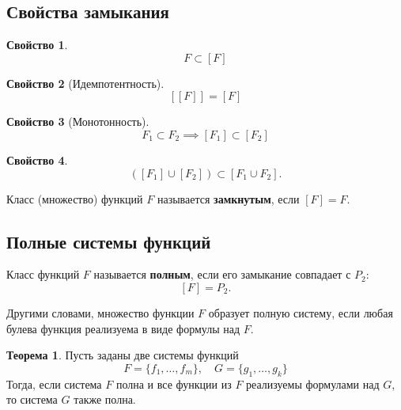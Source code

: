 \documentclass[a5paper, 11pt]{extarticle}
\theoremstyle{definition}
\newtheorem*{theorem*}{Теорема}
\newtheorem{property}{Свойство}[subsection]
\theoremstyle{definition}
\theoremstyle{definition}
\numberwithin{figure}{section}
\numberwithin{table}{section}
\begin{document}
\subsection{Свойства замыкания}

\begin{property}
    \[
        F \subset [F]
    \]
\end{property}

\begin{property}[Идемпотентность]
    \[
        [[F]] = [F]
    \]
\end{property}

\begin{property}[Монотонность]
    \[
        F_1 \subset F_2 \implies [F_1] \subset [F_2]
    \]
\end{property}

\begin{property}
    \[
        ([F_1] \cup [F_2]) \subset [F_1 \cup F_2].
    \]
\end{property}

Класс (множество) функций \(F\) называется \textbf{замкнутым}, если \([F] = F\).

\subsection{Полные системы функций}

Класс функций \(F\) называется \textbf{полным}, если его замыкание совпадает с \(P_2\):
\[
    [F] = P_2.
\]

Другими словами, множество функции \(F\) образует полную систему, если любая булева функция реализуема в виде формулы над \(F\).

\begin{theorem*}
    Пусть заданы две системы функций
    \[
        F = \{f_1, \ldots, f_m\},
        \quad
        G = \{g_1, \ldots, g_k\}
    \]
    Тогда, если система \(F\) полна и все функции из \(F\) реализуемы формулами над \(G\), то система \(G\) также полна.
\end{theorem*}
\end{document}
